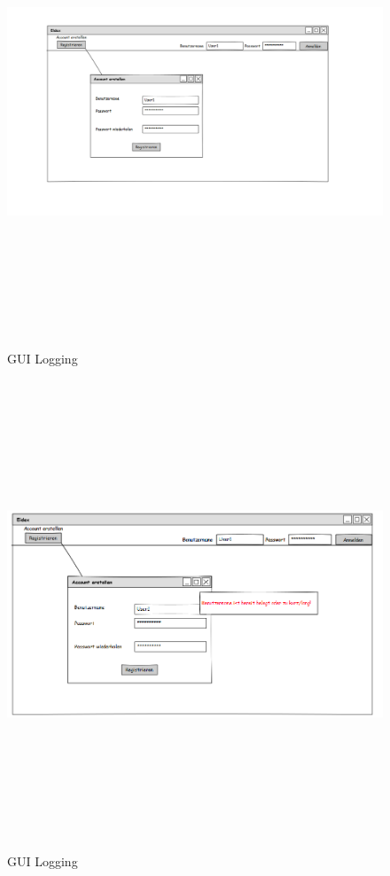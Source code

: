\begin{center}
	\begin{figure}[h]
		\hspace*{-1.5cm}
		\includegraphics[width=170mm, height =140mm]{PencilProjectData/logging1}
		\caption{GUI Logging}
	\end{figure}
	
	
	
	\begin{figure}[h]
		\hspace*{-1.75cm}
		\includegraphics[width=170mm, height =140mm]{PencilProjectData/logging2}
		\caption{GUI Logging}
	\end{figure}
	

\end{center}
